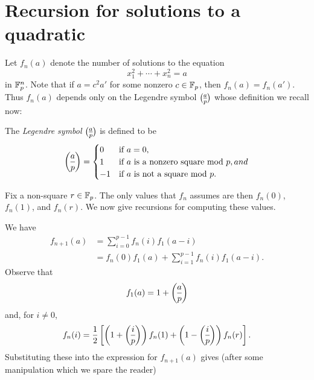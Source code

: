 \section{Recursion for solutions to a quadratic}\label{sec:recursion-for-quadratic-solns}
Let $f_n(a)$ denote the number of solutions to the equation
\[
	x_1^2 + \cdots + x_n^2 = a
\]
in $\mathbb{F}_p^n$. Note that if $a = c^2 a'$ for some nonzero $c \in \mathbb{F}_p$, then $f_n(a) = f_n(a')$. Thus $f_n(a)$ depends only on the Legendre symbol $\legendre{a}{p}$ whose definition we recall now:
\begin{defn}
	The \emph{Legendre symbol} $\legendre{a}{p}$ is defined to be
	\[
		\legendre{a}{p} = \begin{cases}
			0 & \text{if }a = 0,\\
			1 & \text{if }a\text{ is a nonzero square mod }p, and\\
			-1 & \text{if }a\text{ is not a square mod }p.
		\end{cases}
	\]
\end{defn}
Fix a non-square $r\in \mathbb{F}_p$. The only values that $f_n$ assumes are then $f_n(0)$, $f_n(1)$, and $f_n(r)$. We now give recursions for computing these values.

We have
\begin{align*}
	f_{n+1}(a) &= \sum_{i = 0}^{p-1} f_n(i) f_1(a-i)\\
	&= f_n(0) f_1(a) + \sum_{i =1}^{p-1} f_n(i) f_1(a-i).
\end{align*}
Observe that
\[
	f_1(a) = 1+\legendre{a}{p}
\]
and, for $i \neq 0$,
\[
	f_n(i) = \frac{1}{2}\left[\left(1 + \legendre{i}{p}\right)f_n(1) + \left(1 - \legendre{i}{p}\right) f_n(r)\right].
\]
Substituting these into the expression for $f_{n+1}(a)$ gives (after some manipulation which we spare the reader)